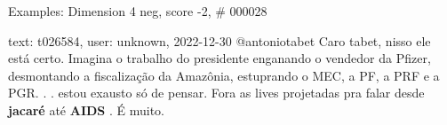 \begin{frame}{Examples: Dimension 4 neg, score -2, \# 000028}
\footnotesize
\begin{alertblock}{text: t026584, user: unknown, 2022-12-30}
@antoniotabet Caro tabet, nisso ele está certo. Imagina o trabalho do 
presidente enganando o vendedor da Pfizer, desmontando a fiscalização da 
Amazônia, estuprando o MEC, a PF, a PRF e a PGR. . . estou exausto só de 
pensar. Fora as lives projetadas pra falar desde \textbf{jacaré} até 
\textbf{AIDS} . É muito. 
\end{alertblock}
\end{frame}
